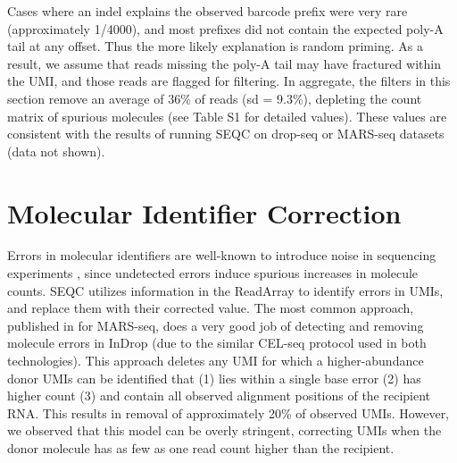 Cases where an indel explains the observed barcode prefix were very rare (approximately 1/4000), and most prefixes did not contain the expected poly-A tail at any offset. 
Thus the more likely explanation is random priming. 
As a result, we assume that reads missing the poly-A tail may have fractured within the UMI, and those reads are flagged for filtering. 
In aggregate, the filters in this section remove an average of 36\% of reads (sd = 9.3\%), depleting the count matrix of spurious molecules (see Table S1 for detailed values). %
These values are consistent with the results of running SEQC on drop-seq or MARS-seq datasets (data not shown).

\section{Molecular Identifier Correction}

Errors in molecular identifiers are well-known to introduce noise in sequencing experiments \citep{Jaitin2014}, since undetected errors induce spurious increases in molecule counts. 
SEQC utilizes information in the ReadArray to identify errors in UMIs, and replace them with their corrected value. 
The most common approach, published in \citep{Jaitin2014} for MARS-seq, does a very good job of detecting and removing molecule errors in InDrop (due to the similar CEL-seq protocol used in both technologies). 
This approach deletes any UMI for which a higher-abundance donor UMIs can be identified that (1) lies within a single base error (2) has higher count (3) and contain all observed alignment positions of the recipient RNA\@. 
This results in removal of approximately 20\% of observed UMIs. However, we observed that this model can be overly stringent, correcting UMIs when the donor molecule has as few as one read count higher than the recipient.

